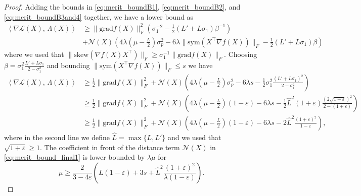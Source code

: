 \documentclass[twoside,11pt]{article}
\newcommand{\grad}{{\mathrm{grad}}}
\newcommand{\sk}{{\mathrm{skew}}}
\newcommand{\sym}{{\mathrm{sym}}}
\newcommand{\cN}{\mathcal{N}} %
\newcommand{\cL}{\mathcal{L}} %
\newcommand{\inner}[2]{\left\langle#1,\,#2\right\rangle} %
\newcommand{\Lc}{L} %
\newcommand{\gradc}{L'} %
\newcommand{\finalrevision}[1]{{#1}}
\begin{document}
\begin{proof}
    Adding the bounds in \eqref{eq:merit_boundB1}, \eqref{eq:merit_boundB2}, and \eqref{eq:merit_boundB3and4} together, we have a lower bound as
    \begin{align}
        \inner{\nabla \cL(X)}{\Lambda(X)} &\geq \|\grad f(X)\|_F^2\left( \sigma_1^{-2} - \frac12(\gradc + \Lc\sigma_1) \beta^{-1} \right) \\
            &+\cN(X) \left(  4\lambda \left(\mu-\frac{\Lc}{2}\right) \sigma_p^2 - 6 \lambda \| \sym(X^\top \nabla f(X)) \|_F  - \frac12(\gradc + \Lc\sigma_1) \beta \right)
    \end{align}
    where we used that $\| \sk(\nabla f(X) X^{\top})\|_F \geq \sigma_1^{-1} \| \grad f(X)\|_F$. Choosing $\beta = \sigma_1^2 \frac{\gradc+\Lc\sigma_1}{2-\sigma_1^2}$ and bounding $\| \sym(X^\top \nabla f(X)) \|_F \leq s$ we have
    \begin{align}
         \inner{\nabla \cL(X)}{\Lambda(X)} &\geq \frac12 \|\grad f(X)\|_F^2 + \cN(X) \left( 4 \lambda \left(\mu-\frac{\Lc}{2}\right) \sigma_p^2 - 6 \lambda  s  - \frac12\sigma_1^2 \frac{(\gradc+\Lc\sigma_1)^2}{2-\sigma_1^2} \right)\\
         &\geq \frac12 \|\grad f(X)\|_F^2 + \cN(X) \left( 4 \lambda \left(\mu-\frac{\Lc}{2}\right) (1-\varepsilon) - 6 \lambda  s  - \frac12 \hat{L}^2(1+\varepsilon) \frac{(2\sqrt{1+\varepsilon})^2}{2-(1+\varepsilon)} \right) \\
         &\geq \frac12 \|\grad f(X)\|_F^2 + \cN(X) \left( 4 \lambda \left(\mu-\frac{\Lc}{2}\right) (1-\varepsilon) - 6 \lambda  s  - \finalrevision{2 \hat{L}^2 \frac{(1+\varepsilon)^2}{1-\varepsilon}} \right), \label{eq:merit_bound_final1}
    \end{align}
    where in the second line we define $\hat{L} = \max\{\Lc, \gradc\}$ and we used that $\sqrt{1+\varepsilon} \geq 1$. 
    The coefficient in front of the distance term $\cN(X)$ in \eqref{eq:merit_bound_final1} is lower bounded by $\lambda \mu$ for
    \begin{equation}  \label{eq:mu-lb}
        \mu \geq \frac{2}{3-4\varepsilon}\left( \Lc(1-\varepsilon) + 3s + \finalrevision{\hat{L}^2 \frac{(1+\varepsilon)^2}{\lambda(1-\varepsilon)}} \right).
    \end{equation}
\end{proof}
%



%
%
%
%



%
%
%
%
%

%
%
%
%
%
\end{document}
